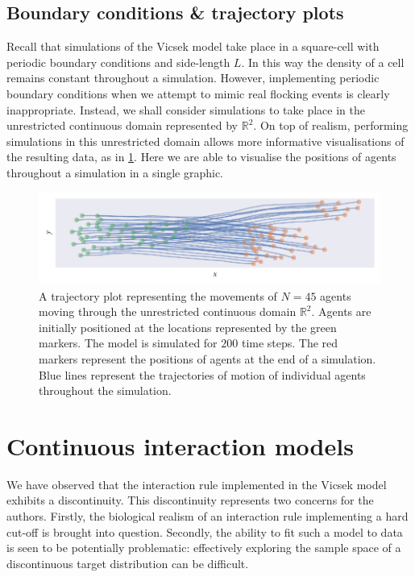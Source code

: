 \subsection{Boundary conditions \& trajectory plots}

Recall that simulations of the Vicsek model take place in a square-cell with periodic
boundary conditions and side-length $L$. In this way the density of a cell remains
constant throughout a simulation. However, implementing periodic boundary conditions when
we attempt to mimic real flocking events is clearly inappropriate. Instead, we shall
consider simulations to take place in the unrestricted continuous domain represented by
$\mathbb{R}^2$.  On top of realism, performing simulations in this unrestricted domain
allows more informative visualisations of the resulting data, as in
\cref{fig:example_traj}. Here we are able to visualise the positions of agents throughout
a simulation in a single graphic.

\begin{figure}[tb]
    \includegraphics{example_traj_plot.pdf}
    \caption{A trajectory plot representing the movements of $N=45$ agents moving through
        the unrestricted continuous domain $\mathbb{R}^2$. Agents are initially positioned
        at the locations represented by the green markers. The model is simulated for
        $200$ time steps. The red markers represent the positions of agents at the end of
        a simulation. Blue lines represent the trajectories of motion of individual agents
        throughout the simulation.}
    \label{fig:example_traj}
\end{figure}

\section{Continuous interaction models}

We have observed that the interaction rule implemented in the Vicsek model exhibits a
discontinuity. This discontinuity represents two concerns for the authors. Firstly, the
biological realism of an interaction rule implementing a hard cut-off is brought into
question. Secondly, the ability to fit such a model to data is seen to be potentially
problematic: effectively exploring the sample space of a discontinuous target
distribution can be difficult.

